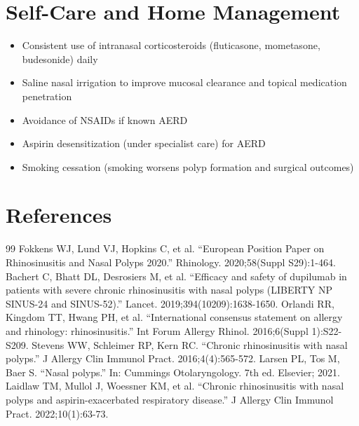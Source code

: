 \section*{Self-Care and Home Management}
\begin{itemize}
  \item Consistent use of intranasal corticosteroids (fluticasone, mometasone, budesonide) daily
  \item Saline nasal irrigation to improve mucosal clearance and topical medication penetration
  \item Avoidance of NSAIDs if known AERD
  \item Aspirin desensitization (under specialist care) for AERD
  \item Smoking cessation (smoking worsens polyp formation and surgical outcomes)
\end{itemize}

\section*{References}
\begin{thebibliography}{99}
 Fokkens WJ, Lund VJ, Hopkins C, et al. ``European Position Paper on Rhinosinusitis and Nasal Polyps 2020.'' Rhinology. 2020;58(Suppl S29):1-464.
 Bachert C, Bhatt DL, Desrosiers M, et al. ``Efficacy and safety of dupilumab in patients with severe chronic rhinosinusitis with nasal polyps (LIBERTY NP SINUS-24 and SINUS-52).'' Lancet. 2019;394(10209):1638-1650.
 Orlandi RR, Kingdom TT, Hwang PH, et al. ``International consensus statement on allergy and rhinology: rhinosinusitis.'' Int Forum Allergy Rhinol. 2016;6(Suppl 1):S22-S209.
 Stevens WW, Schleimer RP, Kern RC. ``Chronic rhinosinusitis with nasal polyps.'' J Allergy Clin Immunol Pract. 2016;4(4):565-572.
 Larsen PL, Tos M, Baer S. ``Nasal polyps.'' In: Cummings Otolaryngology. 7th ed. Elsevier; 2021.
 Laidlaw TM, Mullol J, Woessner KM, et al. ``Chronic rhinosinusitis with nasal polyps and aspirin-exacerbated respiratory disease.'' J Allergy Clin Immunol Pract. 2022;10(1):63-73.
\end{thebibliography}
